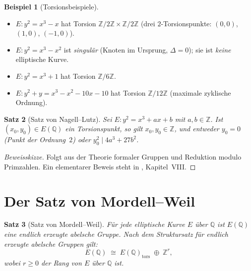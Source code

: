 \documentclass[12pt,a4paper]{amsart}
\newtheorem{theorem}{Satz}[section]
\theoremstyle{definition}
\newtheorem{example}[theorem]{Beispiel}
\newcommand{\Z}{\mathbb{Z}}
\newcommand{\Q}{\mathbb{Q}}
\begin{document}
\begin{example}[Torsionsbeispiele]
\begin{itemize}
  \item $E: y^2 = x^3 - x$ hat Torsion $\Z/2\Z \times \Z/2\Z$
    (drei $2$-Torsionspunkte: $(0,0)$, $(1,0)$, $(-1,0)$).
  \item $E: y^2 = x^3 - x^2$ ist \emph{singulär} (Knoten im Ursprung,
    $\Delta = 0$); sie ist \emph{keine} elliptische Kurve.
  \item $E: y^2 = x^3 + 1$ hat Torsion $\Z/6\Z$.
  \item $E: y^2 + y = x^3 - x^2 - 10x - 10$ hat Torsion $\Z/12\Z$
    (maximale zyklische Ordnung).
\end{itemize}
\end{example}

\begin{theorem}[Satz von Nagell--Lutz]
\label{thm:nagell_lutz}
Sei $E: y^2 = x^3 + ax + b$ mit $a, b \in \Z$.
Ist $(x_0, y_0) \in E(\Q)$ ein Torsionspunkt, so gilt $x_0, y_0 \in \Z$,
und entweder $y_0 = 0$ (Punkt der Ordnung~$2$) oder $y_0^2 \mid 4a^3 + 27b^2$.
\end{theorem}

\begin{proof}[Beweisskizze]
Folgt aus der Theorie formaler Gruppen und Reduktion modulo Primzahlen.
Ein elementarer Beweis steht in \cite{Silverman1986}, Kapitel~VIII.
\end{proof}

\section{Der Satz von Mordell--Weil}

\begin{theorem}[Satz von Mordell--Weil]
\label{thm:mordell_weil}
F\"ur jede elliptische Kurve $E$ \"uber $\Q$ ist $E(\Q)$ eine
endlich erzeugte abelsche Gruppe.
Nach dem Struktursatz f\"ur endlich erzeugte abelsche Gruppen gilt:
\begin{equation}
  \label{eq:mw}
  E(\Q) \;\cong\; E(\Q)_{\mathrm{tors}} \;\oplus\; \Z^r,
\end{equation}
wobei $r \ge 0$ der \emph{Rang} von $E$ \"uber $\Q$ ist.
\end{theorem}
\end{document}
